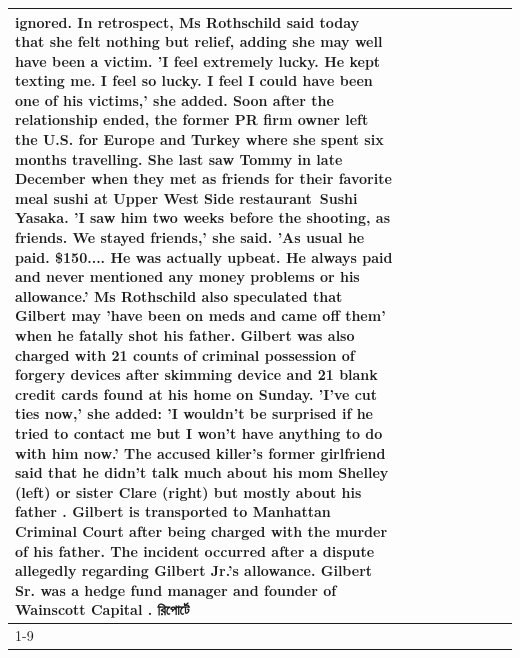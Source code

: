 \begin{table}[H]
\begin{tabular}{lllrlllll}
ignored. In retrospect, Ms Rothschild said today that she felt nothing but relief, adding she may well have been a victim. 'I feel extremely lucky. He kept texting me. I feel so lucky. I feel I could have been one of his victims,' she added. Soon after the relationship ended, the former PR firm owner left the U.S. for Europe and Turkey where she spent six months  travelling. She last saw Tommy in late December when they met as friends for their favorite meal sushi at Upper West Side restaurant Sushi Yasaka. 'I saw him two weeks before the shooting, as friends. We stayed friends,' she said. 'As usual he paid. \$150.... He was actually upbeat. He always paid and never mentioned any money problems or his allowance.' Ms Rothschild also speculated that Gilbert may 'have been on meds and came off them' when he fatally shot his father. Gilbert was also charged with 21 counts of criminal possession of forgery devices after skimming device and 21 blank credit cards found at his home on Sunday. 'I've cut ties now,' she added: 'I wouldn’t be surprised if he tried to contact me but I won’t have anything to do with him now.' The accused killer's former girlfriend said that he didn't talk much about his mom Shelley (left) or sister Clare (right) but mostly about his father . Gilbert is transported to Manhattan Criminal Court  after being charged with the murder of his father. The incident occurred after a dispute allegedly regarding Gilbert Jr.'s allowance. Gilbert Sr. was a hedge fund manager and founder of Wainscott Capital . রিপোর্টে \\
\cline{1-9}

\end{tabular}
\end{table}
